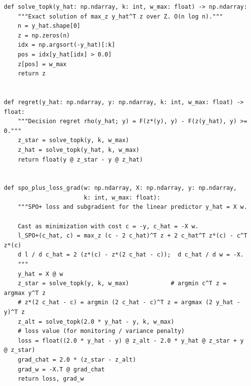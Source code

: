 \begin{lstlisting}[caption={The decision layer: exact oracle, regret, and the SPO+ subgradient (\texttt{risp.py}).},label={lst:dd6-decision}]
def solve_topk(y_hat: np.ndarray, k: int, w_max: float) -> np.ndarray:
    """Exact solution of max_z y_hat^T z over Z. O(n log n)."""
    n = y_hat.shape[0]
    z = np.zeros(n)
    idx = np.argsort(-y_hat)[:k]
    pos = idx[y_hat[idx] > 0.0]
    z[pos] = w_max
    return z


def regret(y_hat: np.ndarray, y: np.ndarray, k: int, w_max: float) -> float:
    """Decision regret rho(y_hat; y) = F(z*(y), y) - F(z(y_hat), y) >= 0."""
    z_star = solve_topk(y, k, w_max)
    z_hat = solve_topk(y_hat, k, w_max)
    return float(y @ z_star - y @ z_hat)


def spo_plus_loss_grad(w: np.ndarray, X: np.ndarray, y: np.ndarray,
                       k: int, w_max: float):
    """SPO+ loss and subgradient for the linear predictor y_hat = X w.

    Cast as minimization with cost c = -y, c_hat = -X w.
    l_SPO+(c_hat, c) = max_z (c - 2 c_hat)^T z + 2 c_hat^T z*(c) - c^T z*(c)
    d l / d c_hat = 2 (z*(c) - z*(2 c_hat - c));  d c_hat / d w = -X.
    """
    y_hat = X @ w
    z_star = solve_topk(y, k, w_max)            # argmin c^T z = argmax y^T z
    # z*(2 c_hat - c) = argmin (2 c_hat - c)^T z = argmax (2 y_hat - y)^T z
    z_alt = solve_topk(2.0 * y_hat - y, k, w_max)
    # loss value (for monitoring / variance penalty)
    loss = float((2.0 * y_hat - y) @ z_alt - 2.0 * y_hat @ z_star + y @ z_star)
    grad_chat = 2.0 * (z_star - z_alt)
    grad_w = -X.T @ grad_chat
    return loss, grad_w
\end{lstlisting}

